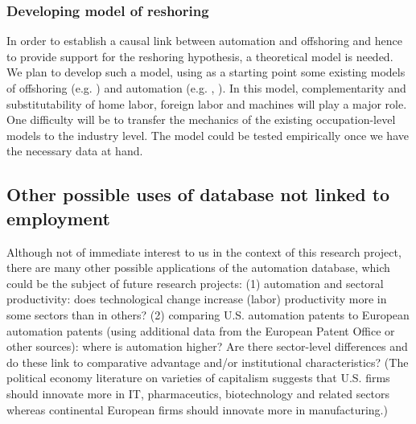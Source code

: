 \documentclass[11pt,a4paper]{article}
\begin{document}
\subsubsection*{Developing model of reshoring}

In order to establish a causal link between automation and offshoring and hence to provide support for the reshoring hypothesis, a theoretical model is needed. We plan to develop such a model, using as a starting point some existing models of offshoring (e.g. \cite{GR2008}) and automation (e.g. \cite{ALM2003}, \cite{L2011}). In this model, complementarity and substitutability of home labor, foreign labor and machines will play a major role. One difficulty will be to transfer the mechanics of the existing occupation-level models to the industry level. The model could be tested empirically once we have the necessary data at hand. 

\subsection{Other possible uses of database not linked to employment}
Although not of immediate interest to us in the context of this research project, there are many other possible applications of the automation database, which could be the subject of future research projects: (1) automation and sectoral productivity: does technological change increase (labor) productivity more in some sectors than in others? (2) comparing U.S. automation patents to European automation patents (using additional data from the European Patent Office or other sources): where is automation higher? Are there sector-level differences and do these link to comparative advantage and/or institutional characteristics? (The political economy literature on varieties of capitalism suggests that U.S. firms should innovate more in IT, pharmaceutics, biotechnology and related sectors whereas continental European firms should innovate more in manufacturing.)
\end{document}
